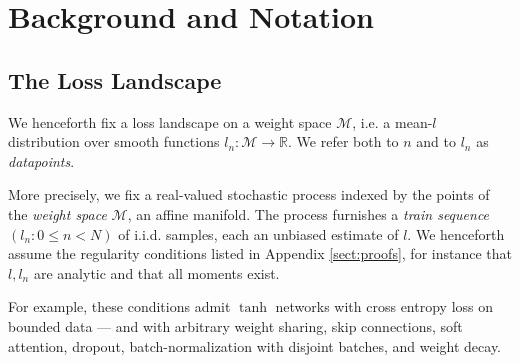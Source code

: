 \documentclass{article}
\theoremstyle{plain}
\theoremstyle{definition}
\newcommand{\Mm}{\mathcal{M}}
\newcommand{\RR}{\mathbb{R}}
\begin{document}

\section{Background and Notation} \label{sect:background}


    \subsection{The Loss Landscape}
        We henceforth fix a loss landscape on a weight space $\Mm$, i.e. a
        mean-$l$ distribution over smooth functions $l_n:\Mm\to\RR$.
        We refer both to $n$ and to $l_n$ as \emph{datapoints}.

        More precisely, we fix a real-valued stochastic process indexed by the
        points of the \emph{weight space} $\Mm$, an affine manifold.  The
        process furnishes a \emph{train sequence} $(l_n: 0\leq n<N)$ of i.i.d.
        samples, each an unbiased estimate of $l$. We henceforth assume the
        regularity conditions listed in Appendix \ref{sect:proofs}, for
        instance that $l, l_n$ are analytic and that all moments exist.

        For example, these conditions admit $\tanh$ networks with cross entropy
        loss on bounded data --- and with arbitrary weight sharing, skip
        connections, soft attention, dropout, batch-normalization with disjoint
        batches, and weight decay.
        
\end{document}
